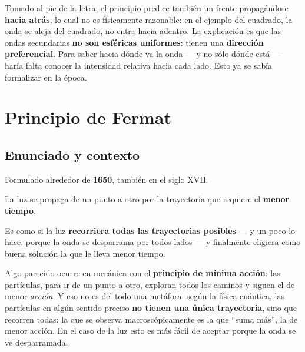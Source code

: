 \documentclass[12pt,a4paper]{article}
\begin{document}
\begin{warnbox}
Tomado al pie de la letra, el principio predice también un frente propagándose
\textbf{hacia atrás}, lo cual no es físicamente razonable: en el ejemplo del
cuadrado, la onda se aleja del cuadrado, no entra hacia adentro. La explicación
es que las ondas secundarias \textbf{no son esféricas uniformes}: tienen una
\textbf{dirección preferencial}. Para saber hacia dónde va la onda --- y no sólo
dónde está --- haría falta conocer la intensidad relativa hacia cada lado. Esto ya
se sabía formalizar en la época.
\end{warnbox}

\section{Principio de Fermat}

\subsection{Enunciado y contexto}

Formulado alrededor de \textbf{1650}, también en el siglo XVII.

\begin{keybox}
La luz se propaga de un punto a otro por la trayectoria que requiere el
\textbf{menor tiempo}.
\end{keybox}

Es como si la luz \textbf{recorriera todas las trayectorias posibles} --- y un
poco lo hace, porque la onda se desparrama por todos lados --- y finalmente
eligiera como buena solución la que le lleva menor tiempo.

\begin{notebox}
Algo parecido ocurre en mecánica con el \textbf{principio de mínima acción}: las
partículas, para ir de un punto a otro, exploran todos los caminos y siguen el de
menor \emph{acción}. Y eso no es del todo una metáfora: según la física cuántica,
las partículas en algún sentido preciso \textbf{no tienen una única
trayectoria}, sino que recorren todas; la que se observa macroscópicamente es la
que \enquote{suma más}, la de menor acción. En el caso de la luz esto es más
fácil de aceptar porque la onda se ve desparramada.
\end{notebox}
\end{document}
